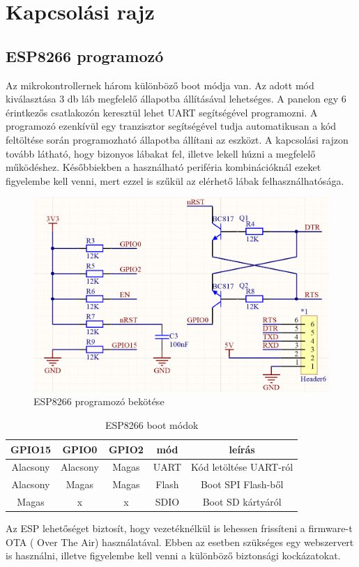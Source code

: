 \section{Kapcsolási rajz}

\subsection{ESP8266 programozó}
Az mikrokontrollernek három különböző boot módja van. Az adott mód kiválasztása 3 db láb megfelelő állapotba állításával lehetséges. A panelon egy 6 érintkezős csatlakozón keresztül lehet UART segítségével programozni. A programozó ezenkívül egy tranzisztor segítségével tudja automatikusan a kód feltöltése során programozható állapotba állítani az eszközt. A kapcsolási rajzon tovább látható, hogy bizonyos lábakat fel, illetve lekell húzni a megfelelő működéshez. Későbbiekben a használható periféria kombinációknál ezeket figyelembe kell venni, mert ezzel is szűkül az elérhető lábak felhasználhatósága.

\begin{figure}[!ht]
    \centering
    \includegraphics[width=130mm, keepaspectratio]{figures/programmer.png}
    \caption{ESP8266 programozó bekötése}
    \label{fig:TeXstudio}
\end{figure}

\begin{table}[ht]
	\footnotesize
	\centering
	\begin{tabular}{ | c | c | c | c | c |}
		\toprule
		GPIO15 & GPIO0 & GPIO2 & mód & leírás \\
		\midrule
        Alacsony & Alacsony & Magas & UART & Kód letöltése UART-ról \\
        \hline
        Alacsony & Magas & Magas & Flash & Boot SPI Flash-ből \\
        \hline
		Magas & x  & x & SDIO & Boot SD kártyáról \\
		\bottomrule
	\end{tabular}
	\caption{ESP8266 boot módok}
	\label{tab:TabularExample}
\end{table}
Az ESP lehetőséget biztosít, hogy vezetéknélkül is lehessen frissíteni a firmware-t OTA ( Over The Air) használatával. Ebben az esetben szükséges egy webszervert is használni, illetve figyelembe kell venni a különböző biztonsági kockázatokat.


